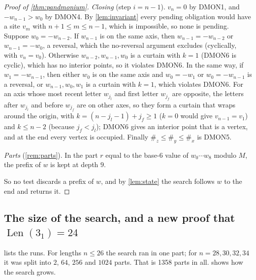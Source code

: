 \documentclass[11pt]{article}
\theoremstyle{plain}
\theoremstyle{definition}
\theoremstyle{remark}
\newcommand{\Len}{\operatorname{Len}}
\newcommand{\dmon}[1]{\textup{DMON#1}}
\begin{document}
\begin{proof}[Proof of \cref{thm:pandmonium}]
\emph{Closing} (step $i=n-1$). $v_n=0$ by \dmon1, and $-w_{n-1}>w_0$ by \dmon4. By
\cref{lem:invariant} every pending obligation would have a site $v_m$ with $n+1\le m\le n-1$, which is
impossible, so none is pending. Suppose $w_0=-w_{n-2}$. If $w_{n-1}$ is on the same axis, then
$w_{n-1}=-w_{n-2}$ or $w_{n-1}=-w_0$, a reversal, which the no-reversal argument excludes (cyclically,
with $v_n=v_0$). Otherwise $w_{n-2},w_{n-1},w_0$ is a curtain with $k=1$ (\dmon6 is cyclic), which has no
interior points, so it violates \dmon6. In the same way, if $w_1=-w_{n-1}$, then either $w_0$ is on the
same axis and $w_0=-w_1$ or $w_0=-w_{n-1}$ is a reversal, or $w_{n-1},w_0,w_1$ is a curtain with $k=1$,
which violates \dmon6. For an axis whose most recent letter $w_{j_l}$ and first letter $w_{j_f}$ are
opposite, the letters after $w_{j_l}$ and before $w_{j_f}$ are on other axes, so they form a curtain
that wraps around the origin, with $k=(n-j_l-1)+j_f\ge1$ ($k=0$ would give $v_{n-1}=v_1$) and
$k\le n-2$ (because $j_f<j_l$); \dmon6
gives an interior point that is a vertex, and at the end every vertex is occupied. Finally
$\#_z\le\#_y\le\#_x$ is \dmon5.

\emph{Parts} (\cref{rem:parts}). In the part $r$ equal to the base-$6$ value of $w_0\cdots w_8$ modulo $M$,
the prefix of $w$ is kept at depth $9$.

So no test discards a prefix of $w$, and by \cref{lem:state} the search follows $w$ to the end and
returns it.
\end{proof}

\subsection{The size of the search, and a new proof that $\Len(3_1)=24$}

 lists the runs. For lengths $n\le26$ the search ran in one part; for $n=28,30,32,34$
it was split into $2$, $64$, $256$ and $1024$ parts. That is \num{1358} parts in all. 
shows how the search grows.

\begin{table}[t]
\centering
\caption{The proof runs. For each length $n$: the number of parts, the search nodes summed over the
parts, and the number of distinct words returned. Every returned word passed the colouring test of
\cref{sec:certificates}. For split runs the node sums count the shallow part of the tree once per part.
No word of length at most $22$ passes the DMON tests.}
\label{tab:runs}

\end{table}
\end{document}

